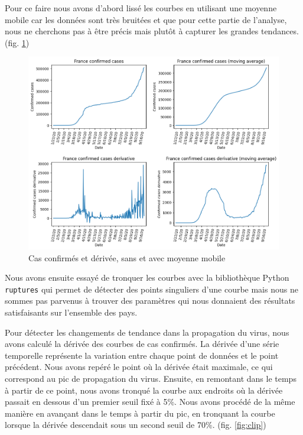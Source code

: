 \documentclass[12pt]{iEEEtran}
\begin{document}
Pour ce faire nous avons d'abord lissé les courbes en utilisant une moyenne mobile car les données sont
très bruitées et que pour cette partie de l'analyse, nous ne cherchons pas à être précis mais plutôt à
capturer les grandes tendances. (fig. \ref{fig:moving_avg})

\begin{figure}[h]
    \centering
    \includegraphics[width=\columnwidth]{img/moving_avg.png}
    \caption{Cas confirmés et dérivée, sans et avec moyenne mobile}
    \label{fig:moving_avg}
\end{figure}

Nous avons ensuite essayé de tronquer les courbes avec la bibliothèque Python \texttt{ruptures} qui
permet de détecter des points singuliers d'une courbe mais nous ne sommes pas parvenus à trouver
des paramètres qui nous donnaient des résultats satisfaisants sur l'ensemble des pays.

Pour détecter les changements de tendance dans la propagation du virus, nous avons calculé la dérivée
des courbes de cas confirmés. La dérivée d'une série temporelle représente la variation entre chaque point
de données et le point précédent. Nous avons repéré le point où la dérivée était maximale, ce qui
correspond au pic de propagation du virus. Ensuite, en remontant dans le temps à partir de ce point,
nous avons tronqué la courbe aux endroits où la dérivée passait en dessous d'un premier seuil fixé à 5\%.
Nous avons procédé de la même manière en avançant dans le temps à partir du pic, en tronquant la courbe
lorsque la dérivée descendait sous un second seuil de 70\%. (fig. \ref{fig:clip})
\end{document}
